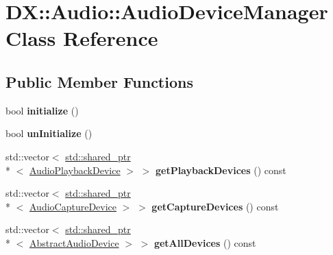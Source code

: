\hypertarget{class_d_x_1_1_audio_1_1_audio_device_manager}{\section{D\-X\-:\-:Audio\-:\-:Audio\-Device\-Manager Class Reference}
\label{class_d_x_1_1_audio_1_1_audio_device_manager}
}
\subsection*{Public Member Functions}
\begin{DoxyCompactItemize}
\item 
\hypertarget{class_d_x_1_1_audio_1_1_audio_device_manager_aa9dba80633884865cc49c70483a32b21}{bool {\bfseries initialize} ()}\label{class_d_x_1_1_audio_1_1_audio_device_manager_aa9dba80633884865cc49c70483a32b21}

\item 
\hypertarget{class_d_x_1_1_audio_1_1_audio_device_manager_a1a08f67dd007894212e5e1aaff0c18bf}{bool {\bfseries un\-Initialize} ()}\label{class_d_x_1_1_audio_1_1_audio_device_manager_a1a08f67dd007894212e5e1aaff0c18bf}

\item 
\hypertarget{class_d_x_1_1_audio_1_1_audio_device_manager_a4b977076115ff0408bd09c73d8852287}{std\-::vector$<$ \hyperlink{classstd_1_1shared__ptr}{std\-::shared\-\_\-ptr}\\*
$<$ \hyperlink{class_d_x_1_1_audio_1_1_audio_playback_device}{Audio\-Playback\-Device} $>$ $>$ {\bfseries get\-Playback\-Devices} () const }\label{class_d_x_1_1_audio_1_1_audio_device_manager_a4b977076115ff0408bd09c73d8852287}

\item 
\hypertarget{class_d_x_1_1_audio_1_1_audio_device_manager_a353d7ceb8444ea742313cf290aff5820}{std\-::vector$<$ \hyperlink{classstd_1_1shared__ptr}{std\-::shared\-\_\-ptr}\\*
$<$ \hyperlink{class_d_x_1_1_audio_1_1_audio_capture_device}{Audio\-Capture\-Device} $>$ $>$ {\bfseries get\-Capture\-Devices} () const }\label{class_d_x_1_1_audio_1_1_audio_device_manager_a353d7ceb8444ea742313cf290aff5820}

\item 
\hypertarget{class_d_x_1_1_audio_1_1_audio_device_manager_afe6a0b08ac3b2673eb3645a03a1de00d}{std\-::vector$<$ \hyperlink{classstd_1_1shared__ptr}{std\-::shared\-\_\-ptr}\\*
$<$ \hyperlink{class_d_x_1_1_audio_1_1_abstract_audio_device}{Abstract\-Audio\-Device} $>$ $>$ {\bfseries get\-All\-Devices} () const }\label{class_d_x_1_1_audio_1_1_audio_device_manager_afe6a0b08ac3b2673eb3645a03a1de00d}


\end{DoxyCompactItemize}
